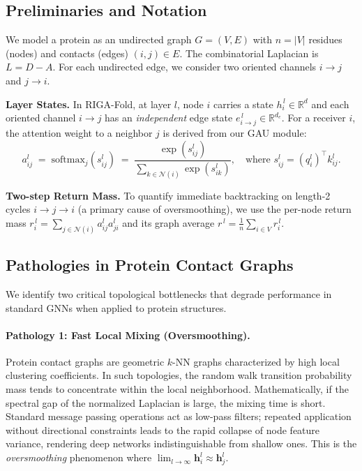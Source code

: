 \documentclass{article}
\theoremstyle{plain}
\theoremstyle{definition}
\theoremstyle{remark}
\begin{document}
{\subsection{Preliminaries and Notation}
We model a protein as an undirected graph $G=(V,E)$ with $n=|V|$ residues (nodes) and contacts (edges) $(i,j)\in E$. The combinatorial Laplacian is $L=D-A$. For each undirected edge, we consider two oriented channels $i\!\to\!j$ and $j\!\to\!i$.

\textbf{Layer States.} In RIGA-Fold, at layer $l$, node $i$ carries a state $h_i^{\,l}\in\mathbb{R}^d$ and each oriented channel $i\!\to\!j$ has an \emph{independent} edge state $e_{i\to j}^{\,l}\in\mathbb{R}^{d_e}$.
For a receiver $i$, the attention weight to a neighbor $j$ is derived from our GAU module:
\begin{equation}
\label{eq:attn_def}
a_{ij}^l \;=\; \mathrm{softmax}_j(s_{ij}^l) \;=\; \frac{\exp(s_{ij}^l)}{\sum_{k\in\mathcal{N}(i)} \exp(s_{ik}^l)}, \quad \text{where } s_{ij}^l = (q_i^l)^\top k_{ij}^l.
\end{equation}

\textbf{Two-step Return Mass.} To quantify immediate backtracking on length-2 cycles $i\!\to\!j\!\to\!i$ (a primary cause of oversmoothing), we use the per-node return mass $r_i^{\,l}=\sum_{j\in\mathcal{N}(i)} a_{ij}^l a_{ji}^l$ and its graph average $r^{\,l} = \frac{1}{n}\sum_{i\in V} r_i^{\,l}$.



\subsection{Pathologies in Protein Contact Graphs}

We identify two critical topological bottlenecks that degrade performance in standard GNNs when applied to protein structures.

\paragraph{Pathology 1: Fast Local Mixing (Oversmoothing).}
Protein contact graphs are geometric $k$-NN graphs characterized by high local clustering coefficients. In such topologies, the random walk transition probability mass tends to concentrate within the local neighborhood.
Mathematically, if the spectral gap of the normalized Laplacian is large, the mixing time is short. Standard message passing operations act as low-pass filters; repeated application without directional constraints leads to the rapid collapse of node feature variance, rendering deep networks indistinguishable from shallow ones. This is the \textit{oversmoothing} phenomenon where $\lim_{l \to \infty} \mathbf{h}_i^l \approx \mathbf{h}_j^l$.

}
\end{document}
